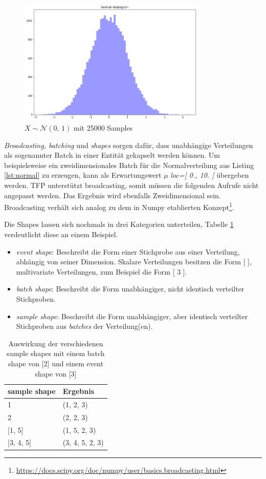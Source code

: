 \documentclass[12pt]{article}
\begin{document}
\begin{figure}[h]
    \centering
    \includegraphics[width=0.8\textwidth]{./figs/normal-dist.png}
    \caption{$X \sim \mathcal{N}(0,\, 1)$ mit 25000 Samples}
    \label{fig:normal_dist}
\end{figure}

\textit{Broadcasting, batching} und \textit{shapes} sorgen dafür, dass unabhängige Verteilungen als sogenannter Batch in einer Entität  gekapselt werden können. Um beispielsweise ein zweidimensionales Batch für die Normalverteilung aus Listing \ref{lst:normal} zu erzeugen, kann als Erwartungswert $\mu$ \textit{loc=[ 0., 10. ]} übergeben werden. TFP unterstützt broadcasting, somit müssen die folgenden Aufrufe nicht angepasst werden. Das Ergebnis wird ebenfalls Zweidimensional sein. Broadcasting verhält sich analog zu dem in Numpy etablierten Konzept\footnote{\url{https://docs.scipy.org/doc/numpy/user/basics.broadcasting.html}}.

Die Shapes lassen sich nochmals in drei Kategorien unterteilen, Tabelle \ref{table:shapes} verdeutlicht diese an einem Beispiel.
\begin{itemize}
  \item \textit{event shape}: Beschreibt die Form einer Stichprobe aus einer Verteilung, abhängig von seiner Dimension. Skalare Verteilungen besitzen die Form [ ], multivariate Verteilungen, zum Beispiel die Form [ 3 ].
  \item \textit{batch shape}: Beschreibt die Form unabhängiger, nicht identisch verteilter Stichproben.
  \item \textit{sample shape}: Beschreibt die Form unabhängiger, aber identisch verteilter Stichproben aus \textit{batches} der Verteilung(en).
\end{itemize}

\begin{table}[]
\centering
\begin{tabular}{|l|l|}
\hline
sample shape  & Ergebnis        \\ \hline
1             & (1, 2, 3)       \\ \hline
2             & (2, 2, 3)       \\ \hline
{[}1, 5{]}    & (1, 5, 2, 3)    \\ \hline
{[}3, 4, 5{]} & (3, 4, 5, 2, 3) \\ \hline
\end{tabular}
\caption{Auswirkung der verschiedenen sample shapes mit einem batch shape von [2] und einem event shape von [3]}
\label{table:shapes}
\end{table}
\end{document}
